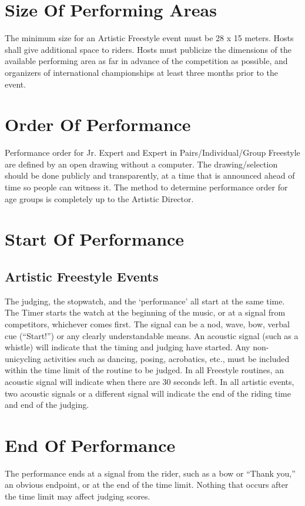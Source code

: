 \section{Size Of Performing Areas}
The minimum size for an Artistic Freestyle event must be 28 x 15 meters.
Hosts shall give additional space to riders.
Hosts must publicize the dimensions of the available performing area as far in advance of the competition as possible, and organizers of international championships at least three months prior to the event.

\section{Order Of Performance}
Performance order for Jr. Expert and Expert in Pairs/Individual/Group Freestyle are defined by an open drawing without a computer.
The drawing/selection should be done publicly and transparently, at a time that is announced ahead of time so people can witness it.
The method to determine performance order for age groups is completely up to the Artistic Director.

\section{Start Of Performance}

\subsection{Artistic Freestyle Events}
The judging, the stopwatch, and the `performance' all start at the same time.
The Timer starts the watch at the beginning of the music, or at a signal from competitors, whichever comes first.
The signal can be a nod, wave, bow, verbal cue (``Start!'') or any clearly understandable means.
An acoustic signal (such as a whistle) will indicate that the timing and judging have started.
Any non-unicycling activities such as dancing, posing, acrobatics, etc., must be included within the time limit of the routine to be judged.
In all  Freestyle routines, an acoustic signal will indicate when there are 30 seconds left.
In all artistic events, two acoustic signals or a different signal will indicate the end of the riding time and end of the judging.

\section{End Of Performance}
The performance ends at a signal from the rider, such as a bow or ``Thank you,'' an obvious endpoint, or at the end of the time limit.
Nothing that occurs after the time limit may affect judging scores.

